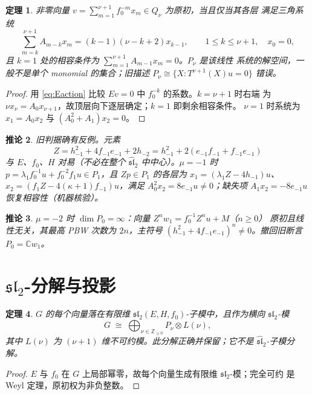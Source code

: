 \documentclass[11pt]{article}
\newcommand{\C}{\mathbb C}
\newcommand{\Z}{\mathbb Z}
\newcommand{\g}{\widehat{\mathfrak{sl}}_2}
\newcommand{\slc}{\mathfrak{sl}_2}
\newtheorem{theorem}{定理}
\newtheorem{corollary}[theorem]{推论}
\begin{document}
\begin{theorem}\label{thm:P}
非零向量 $v=\sum_{m=1}^{\nu+1}f_0^{-m}x_m\in Q_\nu$ 为原初，当且仅当其各层
满足三角系统
\begin{equation}\label{eq:recursion}
 \sum_{m=k}^{\nu+1}A_{m-k}x_m=(k-1)(\nu-k+2)x_{k-1},
 \qquad 1\le k\le\nu+1,\quad x_0=0,
\end{equation}
且 $k=1$ 处的相容条件为 $\sum_{m=1}^{\nu+1}A_{m-1}x_m=0$。$P_\nu$ 是该线性
系统的解空间，一般不是单个 monomial 的集合；旧描述
$P_\nu\cong\{X:T^{\nu+1}(X)u=0\}$ 错误。
\end{theorem}

\begin{proof}
用 \eqref{eq:Eaction} 比较 $Ev=0$ 中 $f_0^{-k}$ 的系数。$k=\nu+1$ 时右端
为 $\nu x_\nu=A_0x_{\nu+1}$，故顶层向下逐层确定；$k=1$ 即剩余相容条件。
$\nu=1$ 时系统为 $x_1=A_0x_2$ 与 $(A_0^2+A_1)x_2=0$。
\end{proof}

\begin{corollary}\label{cor:Zcounter}
旧判据确有反例。元素
\[
 Z=h_{-1}^2+4f_{-1}e_{-1}+2h_{-2}
 =h_{-1}^2+2(e_{-1}f_{-1}+f_{-1}e_{-1})
\]
与 $E$、$f_0$、$H$ 对易（不必在整个 $\g$ 中中心）。$\mu=-1$ 时
$p=\lambda_1f_0^{-1}u+f_0^{-2}f_1u\in P_1$，且 $Zp\in P_1$ 的各层为
$x_1=(\lambda_1Z-4h_{-1})u$、$x_2=(f_1Z-4(\kappa+1)f_{-1})u$，满足
$A_0^2x_2=8e_{-1}u\ne0$；缺失项 $A_1x_2=-8e_{-1}u$ 恢复相容性（机器核验）。
\end{corollary}

\begin{corollary}\label{cor:P0}
$\mu=-2$ 时 $\dim P_0=\infty$：向量 $Z^nw_1=f_0^{-1}Z^nu+M$（$n\ge0$）
原初且线性无关，其最高 PBW 次数为 $2n$，主符号
$(h_{-1}^2+4f_{-1}e_{-1})^n\ne0$。撤回旧断言 $P_0=\C w_1$。
\end{corollary}

\section{\texorpdfstring{$\slc$}{sl2}-分解与投影}

\begin{theorem}\label{thm:sl2}
$G$ 的每个向量落在有限维 $\slc(E,H,f_0)$-子模中，且作为横向 $\slc$-模
\[
 G\;\cong\;\bigoplus_{\nu\in\Z_{\ge0}}P_\nu\otimes L(\nu),
\]
其中 $L(\nu)$ 为 $(\nu+1)$ 维不可约模。此分解正确并保留；它不是
$\g$-子模分解。
\end{theorem}

\begin{proof}
$E$ 与 $f_0$ 在 $G$ 上局部幂零，故每个向量生成有限维 $\slc$-模；完全可约
是 Weyl 定理，原初权为非负整数。
\end{proof}
\end{document}
